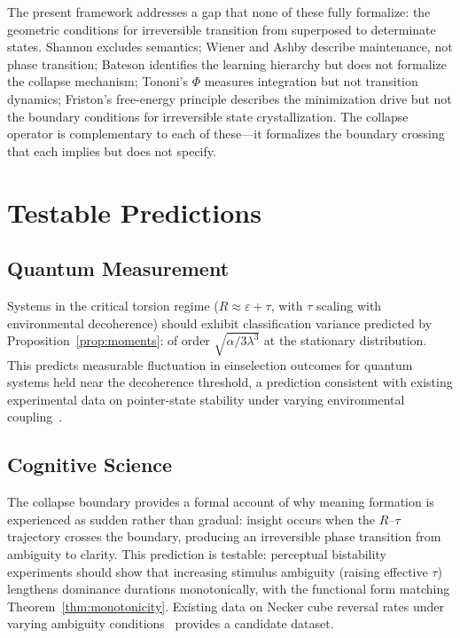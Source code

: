 \documentclass[11pt]{article}
\theoremstyle{plain}
\begin{document}
The present framework addresses a gap that none of these fully formalize: the geometric conditions
for irreversible transition from superposed to determinate states. Shannon excludes semantics;
Wiener and Ashby describe maintenance, not phase transition; Bateson identifies the learning
hierarchy but does not formalize the collapse mechanism; Tononi's $\Phi$ measures integration but
not transition dynamics; Friston's free-energy principle describes the minimization drive but not
the boundary conditions for irreversible state crystallization. The collapse operator is
complementary to each of these---it formalizes the boundary crossing that each implies but does
not specify.

\section{Testable Predictions}

\subsection{Quantum Measurement}

Systems in the critical torsion regime ($R \approx \varepsilon + \tau$, with $\tau$ scaling with
environmental decoherence) should exhibit classification variance predicted by
Proposition~\ref{prop:moments}: of order $\sqrt{\alpha/3\lambda^3}$ at the stationary
distribution. This predicts measurable fluctuation in einselection outcomes for quantum systems
held near the decoherence threshold, a prediction consistent with existing experimental data on
pointer-state stability under varying environmental coupling~\cite{zurek2003}.

\subsection{Cognitive Science}

The collapse boundary provides a formal account of why meaning formation is experienced as sudden
rather than gradual: insight occurs when the $R$--$\tau$ trajectory crosses the boundary, producing
an irreversible phase transition from ambiguity to clarity. This prediction is testable: perceptual
bistability experiments should show that increasing stimulus ambiguity (raising effective $\tau$)
lengthens dominance durations monotonically, with the functional form matching
Theorem~\ref{thm:monotonicity}. Existing data on Necker cube reversal rates under varying
ambiguity conditions~\cite{leopold1999} provides a candidate dataset.
\end{document}
